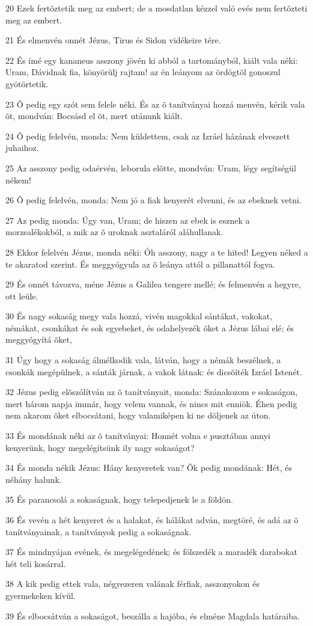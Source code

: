 \par 20 Ezek fertõztetik meg az embert; de a mosdatlan kézzel való evés nem fertõzteti meg az embert.
\par 21 És elmenvén onnét Jézus, Tirus és Sidon vidékeire tére.
\par 22 És ímé egy kananeus asszony jövén ki abból a tartományból, kiált vala néki: Uram, Dávidnak fia, könyörülj rajtam! az én leányom az ördögtõl gonoszul gyötörtetik.
\par 23 Õ pedig egy szót sem felele néki. És az õ tanítványai hozzá menvén, kérik vala õt, mondván: Bocsásd el õt, mert utánunk kiált.
\par 24 Õ pedig felelvén, monda: Nem küldettem, csak az Izráel házának elveszett juhaihoz.
\par 25 Az asszony pedig odaérvén, leborula elõtte, mondván: Uram, légy segítségül nékem!
\par 26 Õ pedig felelvén, monda: Nem jó a fiak kenyerét elvenni, és az ebeknek vetni.
\par 27 Az pedig monda: Úgy van, Uram; de hiszen az ebek is esznek a morzsalékokból, a mik az õ uroknak asztaláról aláhullanak.
\par 28 Ekkor felelvén Jézus, monda néki: Óh asszony, nagy a te hited! Legyen néked a te akaratod szerint. És meggyógyula az õ leánya attól a pillanattól fogva.
\par 29 És onnét távozva, méne Jézus a Galilea tengere mellé; és felmenvén a hegyre, ott leüle.
\par 30 És nagy sokaság megy vala hozzá, vivén magokkal sántákat, vakokat, némákat, csonkákat és sok egyebeket, és odahelyezék õket a Jézus lábai elé; és meggyógyítá õket,
\par 31 Úgy hogy a sokaság álmélkodik vala, látván, hogy a némák beszélnek, a csonkák megépülnek, a sánták járnak, a vakok látnak: és dicsõíték Izráel Istenét.
\par 32 Jézus pedig elõszólítván az õ tanítványait, monda: Szánakozom e sokaságon, mert három napja immár, hogy velem vannak, és nincs mit enniök. Éhen pedig nem akarom õket elbocsátani, hogy valamiképen ki ne dõljenek az úton.
\par 33 És mondának néki az õ tanítványai: Honnét volna e pusztában annyi kenyerünk, hogy megelégítsünk ily nagy sokaságot?
\par 34 És monda nékik Jézus: Hány kenyeretek van? Õk pedig mondának: Hét, és néhány halunk.
\par 35 És parancsolá a sokaságnak, hogy telepedjenek le a földön.
\par 36 És vevén a hét kenyeret és a halakat, és hálákat adván, megtöré, és adá az õ tanítványainak, a tanítványok pedig a sokaságnak.
\par 37 És mindnyájan evének, és megelégedének; és fölszedék a maradék darabokat hét teli kosárral.
\par 38 A kik pedig ettek vala, négyezeren valának férfiak, asszonyokon és gyermekeken kívül.
\par 39 És elbocsátván a sokaságot, beszálla a hajóba, és elméne Magdala határaiba.

